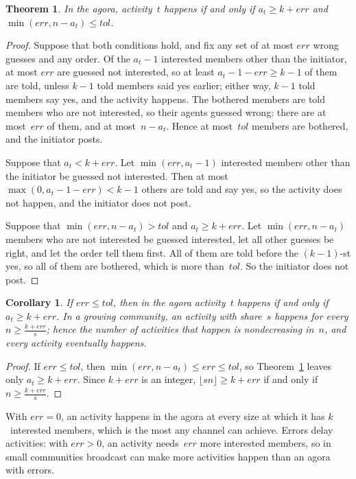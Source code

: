 \documentclass[11pt]{article}
\newtheorem{theorem}{Theorem}
\newtheorem{corollary}{Corollary}
\theoremstyle{definition}
\newcommand{\err}{\mathit{err}}
\newcommand{\tol}{\mathit{tol}}
\begin{document}
\begin{theorem}\label{thm:agora}
In the agora, activity~$t$ happens if and only if $a_t \ge k + \err$ and $\min(\err, n-a_t) \le \tol$.
\end{theorem}
\begin{proof}
Suppose that both conditions hold, and fix any set of at most $\err$ wrong guesses and any order. Of the $a_t-1$ interested members other than the initiator, at most $\err$ are guessed not interested, so at least $a_t-1-\err \ge k-1$ of them are told, unless $k-1$ told members said yes earlier; either way, $k-1$ told members say yes, and the activity happens. The bothered members are told members who are not interested, so their agents guessed wrong: there are at most~$\err$ of them, and at most~$n-a_t$. Hence at most~$\tol$ members are bothered, and the initiator posts.

Suppose that $a_t < k + \err$. Let $\min(\err, a_t-1)$ interested members other than the initiator be guessed not interested. Then at most $\max(0, a_t-1-\err) < k-1$ others are told and say yes, so the activity does not happen, and the initiator does not post.

Suppose that $\min(\err, n-a_t) > \tol$ and $a_t \ge k+\err$. Let $\min(\err, n-a_t)$ members who are not interested be guessed interested, let all other guesses be right, and let the order tell them first. All of them are told before the $(k-1)$-st yes, so all of them are bothered, which is more than~$\tol$. So the initiator does not post.
\end{proof}

\begin{corollary}\label{cor:agora}
If $\err \le \tol$, then in the agora activity~$t$ happens if and only if $a_t \ge k+\err$. In a growing community, an activity with share~$s$ happens for every $n \ge \frac{k+\err}{s}$; hence the number of activities that happen is nondecreasing in~$n$, and every activity eventually happens.
\end{corollary}
\begin{proof}
If $\err \le \tol$, then $\min(\err, n-a_t) \le \err \le \tol$, so Theorem~\ref{thm:agora} leaves only $a_t \ge k+\err$. Since $k+\err$ is an integer, $\lfloor sn \rfloor \ge k+\err$ if and only if $n \ge \frac{k+\err}{s}$.
\end{proof}

With $\err = 0$, an activity happens in the agora at every size at which it has $k$~interested members, which is the most any channel can achieve. Errors delay activities: with $\err > 0$, an activity needs~$\err$ more interested members, so in small communities broadcast can make more activities happen than an agora with errors.
\end{document}
